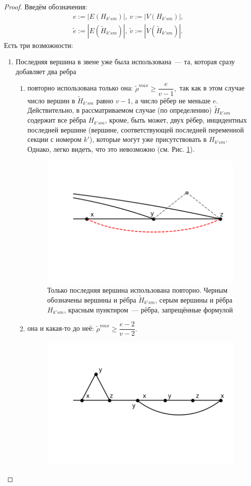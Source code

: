 \begin{proof}
Введём обозначения:
\begin{equation*}
\begin{split}
e:= |E(H_{k'sm})|,~ v:= |V(H_{k'sm})|,\\
\tilde e:= |E(\tilde H_{k'sm})|,~ \tilde v:= |V(\tilde H_{k'sm})|.
\end{split}
\end{equation*}
Есть три возможности:
\begin{enumerate}
\item 
Последняя вершина в звене уже была использована~--- та, которая сразу добавляет два ребра
\begin{enumerate}
\item 
повторно использована только она: $\tilde \rho^{max} \geq \dfrac{e}{v-1},$ 
так как в этом случае число вершин в $\tilde H_{k'sm}$ равно $v-1$, а число рёбер не меньше $e$. Действительно, в рассматриваемом случае (по определению) $\tilde H_{k'sm}$ содержит все рёбра $H_{k'sm}$, кроме, быть может, двух рёбер, инцидентных последней вершине (вершине, соответствующей последней переменной секции с номером $k'$), которые могут уже присутствовать в $H_{k'sm}$.
Однако, легко видеть, что это невозможно (см. Рис. \ref{fig:only last reused}).
\begin{figure}
  \centering
  \includegraphics[scale=0.5]{picrel/only_last_reused.png}
  \caption{Только последняя вершина использована повторно. Черным обозначены вершины и рёбра $\tilde H_{k'sm}$, серым вершины и рёбра  $H_{k'sm}$, красным пунктиром~--- рёбра, запрещённые формулой  }
  \label{fig:only last reused}
\end{figure}
\item
она и какая-то до неё: $\tilde \rho^{max} \geq \dfrac{e-2}{v-2}.$ 
\begin{figure}
  \centering
  \includegraphics[scale=0.5]{picrel/reuse_intermediate.png}

\end{figure}
\end{enumerate}
\end{enumerate}
\end{proof}

